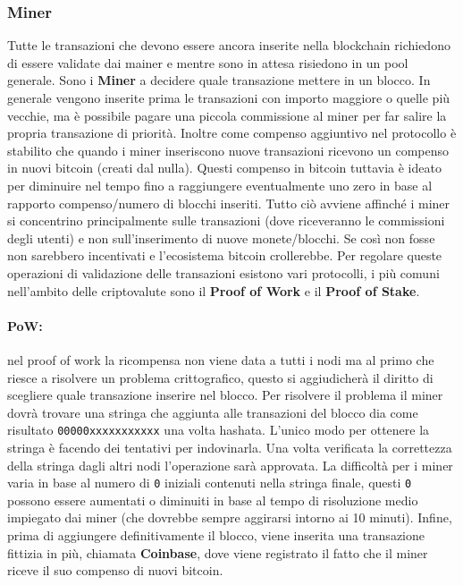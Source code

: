 \subsubsection{Miner}

Tutte le transazioni che devono essere ancora inserite nella blockchain
richiedono di essere validate dai mainer e mentre sono in attesa risiedono in un
pool generale. Sono i \textbf{Miner} a decidere quale transazione mettere in un
blocco. In generale vengono inserite prima le transazioni con importo maggiore o
quelle più vecchie, ma è possibile pagare una piccola commissione al miner per
far salire la propria transazione di priorità. Inoltre come compenso aggiuntivo
nel protocollo è stabilito che quando i miner inseriscono nuove transazioni
ricevono un compenso in nuovi bitcoin (creati dal nulla). Questi compenso in
bitcoin tuttavia è ideato per diminuire nel tempo fino a raggiungere
eventualmente uno zero in base al rapporto compenso/numero di blocchi inseriti.
Tutto ciò avviene affinché i miner si concentrino principalmente sulle
transazioni (dove riceveranno le commissioni degli utenti) e non
sull'inserimento di nuove monete/blocchi. Se così non fosse non sarebbero
incentivati e l'ecosistema bitcoin crollerebbe.
Per regolare queste operazioni di validazione delle transazioni esistono vari
protocolli, i più comuni nell'ambito delle criptovalute sono il \textbf{Proof of
    Work} e il \textbf{Proof of Stake}.

\paragraph{PoW:}
nel proof of work la ricompensa non viene data a tutti i nodi ma al primo che
riesce a risolvere un problema crittografico, questo si aggiudicherà il diritto
di scegliere quale transazione inserire nel blocco. Per risolvere il problema il
miner dovrà trovare una stringa che aggiunta alle transazioni del blocco dia
come risultato \verb|00000xxxxxxxxxxx| una volta hashata. L'unico modo per
ottenere la stringa è facendo dei tentativi per indovinarla. Una volta
verificata la correttezza della stringa dagli altri nodi l'operazione sarà
approvata. La difficoltà per i miner varia in base al numero di \verb|0|
iniziali contenuti nella stringa finale, questi \verb|0| possono essere
aumentati o diminuiti in base al tempo di risoluzione medio impiegato dai miner
(che dovrebbe sempre aggirarsi intorno ai 10 minuti). Infine, prima di
aggiungere definitivamente il blocco, viene inserita una transazione fittizia in
più, chiamata \textbf{Coinbase}, dove viene registrato il fatto che il miner riceve
il suo compenso di nuovi bitcoin.

